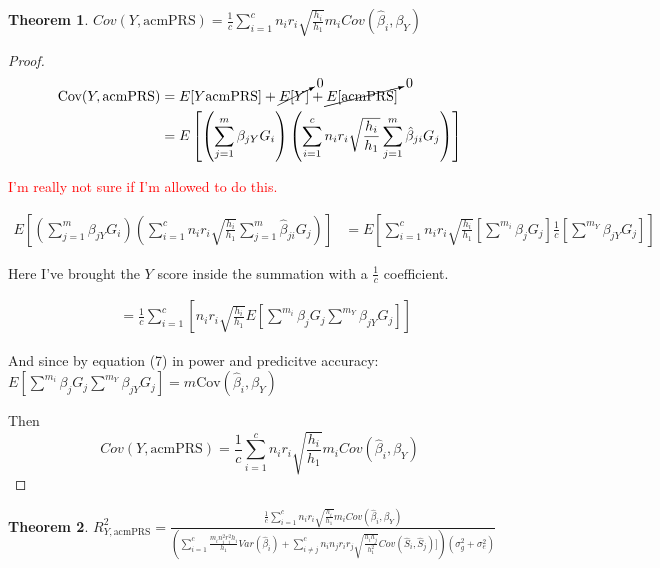 \documentclass{article}
\newtheorem{theorem}{Theorem}
\begin{document}
\newpage

\begin{theorem}
$Cov(Y, \text{acmPRS}) = \frac{1}{c} \sum^c_{i=1} n_i r_i \sqrt{\frac{h_i}{h_1}} m_i Cov(\hat{\beta}_i, \beta_{Y})$
\end{theorem}

\begin{proof}

$$
\begin{aligned}
\text{Cov}(Y, \text{acmPRS}) &= E[Y \text{acmPRS}] + \cancelto{0}{E[Y]} + \cancelto{0}{E[\text{acmPRS}]} \\
&= E \left[ \left( \sum^m_{j=1} \beta_{j Y} G_i \right) \left( \sum^c_{i=1} n_i r_i \sqrt{\frac{h_i}{h_1}} \sum^m_{j=1} \hat{\beta}_{j i} G_j \right) \right] 
\end{aligned}
$$   

\textcolor{red}{I'm really not sure if I'm allowed to do this.}

$$ 
\begin{aligned}
E \left[ \left( \sum^m_{j=1} \beta_{j Y} G_i \right) \left( \sum^c_{i=1} n_i r_i \sqrt{\frac{h_i}{h_1}} \sum^m_{j=1} \hat{\beta}_{j i} G_j \right) \right] &= E \left[ \sum^c_{i=1} n_i r_i \sqrt{\frac{h_i}{h_1}} \left[ \sum^{m_i} \beta_j G_j \right] \frac{1}{c} \left[ \sum^{m_Y} \beta_{jY} G_j \right] \right]
\end{aligned}
$$

Here I've brought the $Y$ score inside the summation with a $\frac{1}{c}$ coefficient.

$$
\begin{aligned}
&= \frac{1}{c} \sum^c_{i=1} \left[ n_i r_i \sqrt{\frac{h_i}{h_1}} E \left[    \sum^{m_i} \beta_j G_j \sum^{m_Y} \beta_{jY} G_j \right] \right]
\end{aligned}
$$

And since by equation (7) in power and predicitve accuracy: $ E \left[ \sum^{m_i} \beta_j G_j \sum^{m_Y} \beta_{jY} G_j \right] = m \text{Cov} (\hat{\beta}_i, \beta_Y)$ 

Then
$$Cov(Y, \text{acmPRS}) = \frac{1}{c} \sum^c_{i=1} n_i r_i \sqrt{\frac{h_i}{h_1}} m_i Cov(\hat{\beta}_i, \beta_{Y})$$

\end{proof}

\newpage

\begin{theorem}
$R^2_{Y, \text{acmPRS}} = \frac{ \frac{1}{c} \sum^c_{i=1} n_i r_i \sqrt{\frac{h_i}{h_1}} m_i Cov(\hat{\beta}_i, \beta_{Y})}{ \left( \sum^c_{i=1}  \frac{m_i n^2_i r^2_i h_i}{h_1}  Var(\hat{\beta}_i) +  \sum^c_{i \neq j} n_i n_j r_i r_j \sqrt{\frac{h_i h_j}{h^2_1}} Cov(\hat{S}_i, \hat{S}_j)] \right) \left( \sigma^2_{g} + \sigma^2_{e} \right)}$
\end{theorem}
\end{document}
